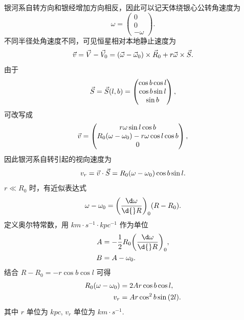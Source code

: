 \documentclass[UTF8, 12pt, a4paper, oneside, onecolumn, fontset=none]{ctexart}
\begin{document}
银河系自转方向和银经增加方向相反，因此可以记天体绕银心公转角速度为
\begin{equation}
\omega=\begin{pmatrix}
0\\
0\\
-\omega
\end{pmatrix}.
\end{equation}
不同半径处角速度不同，可见恒星相对本地静止速度为
\begin{equation}
\vec{v}=\vec{V}-\vec{V}_{0}=\mleft(\vec{\omega}-\vec{\omega}_{0}\mright)\times\vec{R}_{0}+r\vec{\omega}\times\vec{S}.
\end{equation}
由于
\begin{equation}
\vec{S}=\vec{S}\mleft(l, b\mright)=\begin{pmatrix}
\cos{b}\cos{l}\\
\cos{b}\sin{l}\\
\sin{b}
\end{pmatrix},
\end{equation}
可改写成
\begin{equation}
\vec{v}=\begin{pmatrix}
r\omega\sin{l}\cos{b}\\
R_{0}\mleft(\omega-\omega_{0}\mright)-r\omega\cos{l}\cos{b}\\
0
\end{pmatrix},
\end{equation}
因此银河系自转引起的视向速度为
\begin{equation}
v_{r}=\vec{v}\cdot\vec{S}=R_{0}\mleft(\omega-\omega_{0}\mright)\cos{b}\sin{l}.
\end{equation}
$r\ll R_{0}$ 时，有近似表达式
\begin{equation}
\omega-\omega_{0}=\mleft(\frac{\d\omega}{\d{}R}\mright)_{0}\mleft(R-R_{0}\mright).
\end{equation}
定义奥尔特常数，用 $\unit{km\cdot{}s^{-1}\cdot kpc^{-1}}$ 作为单位
\begin{align}
A&=-\frac{1}{2}R_{0}\mleft(\frac{\d\omega}{\d{}R}\mright)_{0},\\
B&=A-\omega_{0}.
\end{align}
结合 $R-R_{0}=-r\cos{b}\cos{l}$ 可得
\begin{align}
R_{0}\mleft(\omega-\omega_{0}\mright)&=2Ar\cos{b}\cos{l},\\
v_{r}&=Ar\cos^{2}{b}\sin{\mleft(2l\mright)}.
\end{align}
其中 $r$ 单位为 $\unit{kpc}$, $v_{r}$ 单位为 $\unit{km\cdot{}s^{-1}}$.
\end{document}
